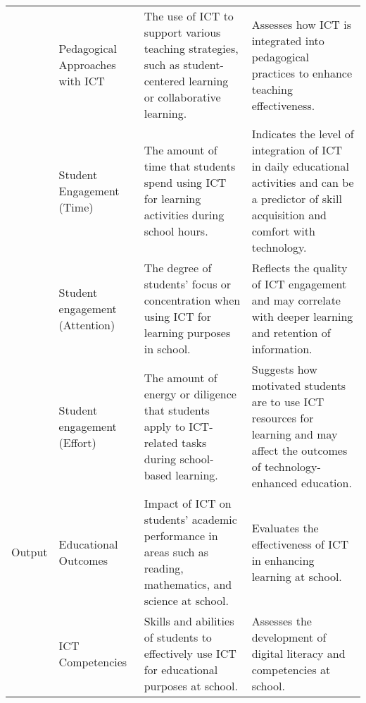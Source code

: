 \documentclass[
]{article}
\begin{document}
\begin{longtable}[l]{>{\raggedright\arraybackslash}p{2cm}>{\raggedright\arraybackslash}p{3cm}>{\raggedright\arraybackslash}p{5cm}>{\raggedright\arraybackslash}p{5cm}}
 & Pedagogical Approaches with ICT & The use of ICT to support various teaching strategies, such as student-centered learning or collaborative learning. & Assesses how ICT is integrated into pedagogical practices to enhance teaching effectiveness.\\
 & Student Engagement (Time) & The amount of time that students spend using ICT for learning activities during school hours. & Indicates the level of integration of ICT in daily educational activities and can be a predictor of skill acquisition and comfort with technology.\\
\addlinespace
 & Student engagement (Attention) & The degree of students' focus or concentration when using ICT for learning purposes in school. & Reflects the quality of ICT engagement and may correlate with deeper learning and retention of information.\\
 & Student engagement (Effort) & The amount of energy or diligence that students apply to ICT-related tasks during school-based learning. & Suggests how motivated students are to use ICT resources for learning and may affect the outcomes of technology-enhanced education.\\
Output & Educational Outcomes & Impact of ICT on students' academic performance in areas such as reading, mathematics, and science at school. & Evaluates the effectiveness of ICT in enhancing learning at school.\\
 & ICT Competencies & Skills and abilities of students to effectively use ICT for educational purposes at school. & Assesses the development of digital literacy and competencies at school.\\
\bottomrule
\end{longtable}
\end{document}
